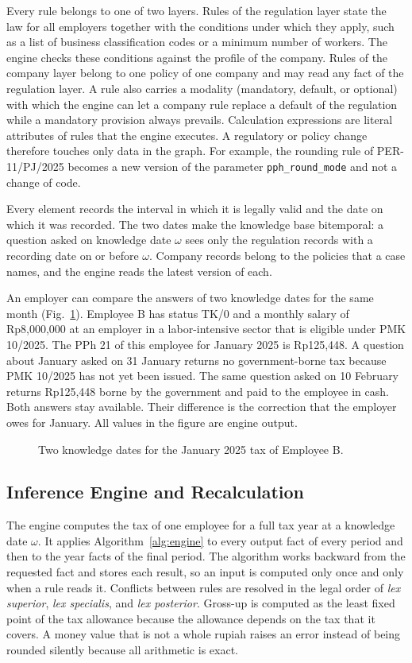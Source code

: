 Every rule belongs to one of two layers. Rules of the regulation layer state the law for all employers together with the conditions under which they apply, such as a list of business classification codes or a minimum number of workers. The engine checks these conditions against the profile of the company. Rules of the company layer belong to one policy of one company and may read any fact of the regulation layer. A rule also carries a modality (mandatory, default, or optional) with which the engine can let a company rule replace a default of the regulation while a mandatory provision always prevails. Calculation expressions are literal attributes of rules that the engine executes. A regulatory or policy change therefore touches only data in the graph. For example, the rounding rule of PER-11/PJ/2025 becomes a new version of the parameter \texttt{pph\_round\_mode} and not a change of code.

Every element records the interval in which it is legally valid and the date on which it was recorded. The two dates make the knowledge base bitemporal: a question asked on knowledge date $\omega$ sees only the regulation records with a recording date on or before $\omega$. Company records belong to the policies that a case names, and the engine reads the latest version of each.

An employer can compare the answers of two knowledge dates for the same month (Fig.~\ref{fig:bitemporal}). Employee B has status TK/0 and a monthly salary of Rp8,000,000 at an employer in a labor-intensive sector that is eligible under PMK 10/2025. The PPh 21 of this employee for January 2025 is Rp125,448. A question about January asked on 31 January returns no government-borne tax because PMK 10/2025 has not yet been issued. The same question asked on 10 February returns Rp125,448 borne by the government and paid to the employee in cash. Both answers stay available. Their difference is the correction that the employer owes for January. All values in the figure are engine output.

\begin{figure}[!t]
\centering
\figBitemporal
\caption{Two knowledge dates for the January 2025 tax of Employee B.}
\label{fig:bitemporal}
\end{figure}

\subsection{Inference Engine and Recalculation}
\label{sec:engine}
The engine computes the tax of one employee for a full tax year at a knowledge date $\omega$. It applies Algorithm~\ref{alg:engine} to every output fact of every period and then to the year facts of the final period. The algorithm works backward from the requested fact and stores each result, so an input is computed only once and only when a rule reads it. Conflicts between rules are resolved in the legal order of \emph{lex superior}, \emph{lex specialis}, and \emph{lex posterior}. Gross-up is computed as the least fixed point of the tax allowance because the allowance depends on the tax that it covers. A money value that is not a whole rupiah raises an error instead of being rounded silently because all arithmetic is exact.

